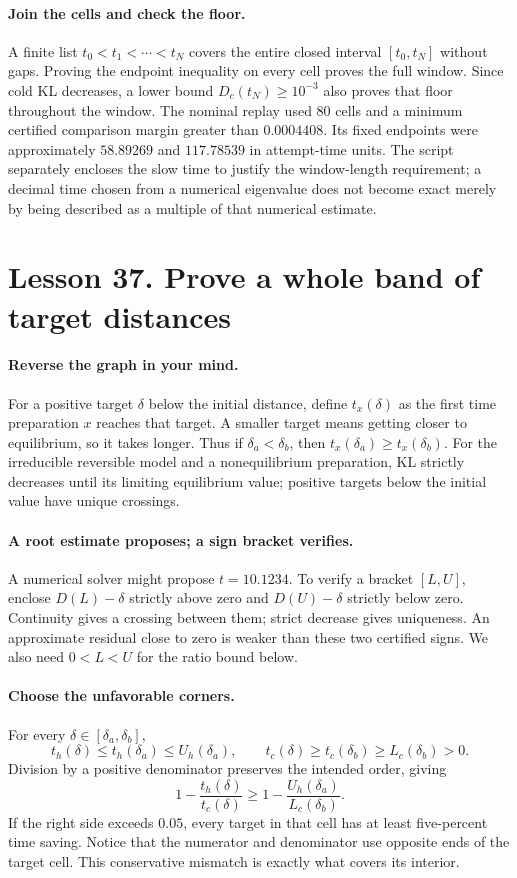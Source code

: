 \documentclass[11pt]{article}
\begin{document}
\paragraph{Join the cells and check the floor.}
A finite list $t_0<t_1<\cdots<t_N$ covers the entire closed interval
$[t_0,t_N]$ without gaps. Proving the endpoint inequality on every cell
proves the full window. Since cold KL decreases, a lower bound
$D_c(t_N)\geq10^{-3}$ also proves that floor throughout the window.
The nominal replay used 80 cells and a minimum certified comparison margin
greater than $0.0004408$. Its fixed endpoints were approximately
$58.89269$ and $117.78539$ in attempt-time units. The script separately
encloses the slow time to justify the window-length requirement; a decimal
time chosen from a numerical eigenvalue does not become exact merely by
being described as a multiple of that numerical estimate.

\section*{Lesson 37. Prove a whole band of target distances}
\paragraph{Reverse the graph in your mind.}
For a positive target $\delta$ below the initial distance, define
$t_x(\delta)$ as the first time preparation $x$ reaches that target.
A smaller target means getting closer to equilibrium, so it takes longer.
Thus if $\delta_a<\delta_b$, then $t_x(\delta_a)\geq t_x(\delta_b)$.
For the irreducible reversible model and a nonequilibrium preparation,
KL strictly decreases until its limiting equilibrium value; positive targets
below the initial value have unique crossings.

\paragraph{A root estimate proposes; a sign bracket verifies.}
A numerical solver might propose $t=10.1234$. To verify a bracket $[L,U]$,
enclose $D(L)-\delta$ strictly above zero and $D(U)-\delta$ strictly below
zero. Continuity gives a crossing between them; strict decrease gives
uniqueness. An approximate residual close to zero is weaker than these
two certified signs. We also need $0<L<U$ for the ratio bound below.

\paragraph{Choose the unfavorable corners.}
For every $\delta\in[\delta_a,\delta_b]$,
\[
 t_h(\delta)\leq t_h(\delta_a)\leq U_h(\delta_a),\qquad
 t_c(\delta)\geq t_c(\delta_b)\geq L_c(\delta_b)>0.
\]
Division by a positive denominator preserves the intended order, giving
\[
 1-\frac{t_h(\delta)}{t_c(\delta)}
 \geq 1-\frac{U_h(\delta_a)}{L_c(\delta_b)}.
\]
If the right side exceeds $0.05$, every target in that cell has at least
five-percent time saving. Notice that the numerator and denominator use
opposite ends of the target cell. This conservative mismatch is exactly
what covers its interior.
\end{document}
